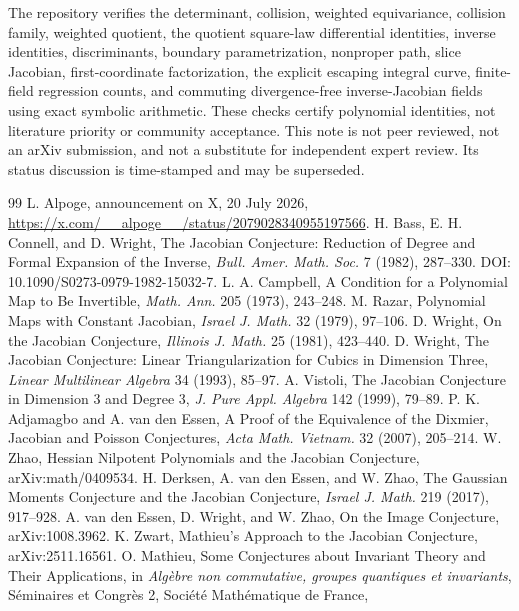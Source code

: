 \documentclass[11pt]{article}
\theoremstyle{remark}
\begin{document}
The repository verifies the determinant, collision, weighted equivariance,
collision family, weighted quotient, the quotient square-law differential
identities, inverse identities, discriminants, boundary parametrization,
nonproper path, slice Jacobian, first-coordinate factorization, the explicit
escaping integral curve, finite-field regression counts, and commuting
divergence-free inverse-Jacobian fields using exact symbolic arithmetic. These checks
certify polynomial identities, not literature priority or community acceptance.
This note is not peer reviewed, not an arXiv submission, and not a substitute
for independent expert review. Its status discussion is time-stamped and may
be superseded.

\small
\begin{thebibliography}{99}
 L. Alpoge, announcement on X, 20 July 2026,
\url{https://x.com/__alpoge__/status/2079028340955197566}.
 H. Bass, E. H. Connell, and D. Wright, The Jacobian Conjecture:
Reduction of Degree and Formal Expansion of the Inverse, \emph{Bull. Amer.
Math. Soc.} 7 (1982), 287--330. DOI: 10.1090/S0273-0979-1982-15032-7.
 L. A. Campbell, A Condition for a Polynomial Map to Be
Invertible, \emph{Math. Ann.} 205 (1973), 243--248.
 M. Razar, Polynomial Maps with Constant Jacobian, \emph{Israel
J. Math.} 32 (1979), 97--106.
 D. Wright, On the Jacobian Conjecture, \emph{Illinois J.
Math.} 25 (1981), 423--440.
 D. Wright, The Jacobian Conjecture: Linear
Triangularization for Cubics in Dimension Three, \emph{Linear Multilinear
Algebra} 34 (1993), 85--97.
 A. Vistoli, The Jacobian Conjecture in Dimension 3 and Degree
3, \emph{J. Pure Appl. Algebra} 142 (1999), 79--89.
 P. K. Adjamagbo and A. van den Essen, A Proof of the
Equivalence of the Dixmier, Jacobian and Poisson Conjectures, \emph{Acta Math.
Vietnam.} 32 (2007), 205--214.
 W. Zhao, Hessian Nilpotent Polynomials and the Jacobian
Conjecture, arXiv:math/0409534.
 H. Derksen, A. van den Essen, and W. Zhao, The Gaussian
Moments Conjecture and the Jacobian Conjecture, \emph{Israel J. Math.} 219
(2017), 917--928.
 A. van den Essen, D. Wright, and W. Zhao, On the Image
Conjecture, arXiv:1008.3962.
 K. Zwart, Mathieu's Approach to the Jacobian Conjecture,
arXiv:2511.16561.
 O. Mathieu, Some Conjectures about Invariant Theory and
Their Applications, in \emph{Alg\`ebre non commutative, groupes quantiques et
invariants}, S\'eminaires et Congr\`es 2, Soci\'et\'e Math\'ematique de France,

\end{thebibliography}
\end{document}
